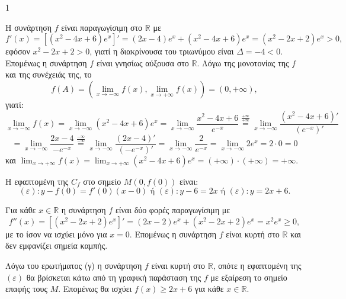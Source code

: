 \begin{ylh}{1}
    \item [Λύση από εικόνα]
\end{ylh}
\begin{alist}
\item Η συνάρτηση $f$ είναι παραγωγίσιμη στο $\mathbb{R}$ με
\[
f'(x)=[(x^2-4x+6)e^x]' = (2x-4)e^x+(x^2-4x+6)e^x = (x^2-2x+2)e^x > 0,
\]
εφόσον $x^2-2x+2 > 0$, γιατί η διακρίνουσα του τριωνύμου είναι $\Delta = -4 < 0$.
Επομένως η συνάρτηση $f$ είναι γνησίως αύξουσα στο $\mathbb{R}$.
Λόγω της μονοτονίας της $f$ και της συνέχειάς της, το
\[
f(A) = \left(\lim_{x \to -\infty} f(x), \lim_{x \to +\infty} f(x)\right) = (0, +\infty),
\]
γιατί:
\[
\lim_{x \to -\infty} f(x) = \lim_{x \to -\infty} (x^2-4x+6)e^x = \lim_{x \to -\infty} \frac{x^2-4x+6}{e^{-x}} \overset{\frac{+\infty}{+\infty}}{=} \lim_{x \to -\infty} \frac{(x^2-4x+6)'}{(e^{-x})'}
\]
\[
= \lim_{x \to -\infty} \frac{2x-4}{-e^{-x}} \overset{\frac{-\infty}{-\infty}}{=} \lim_{x \to -\infty} \frac{(2x-4)'}{(-e^{-x})'} = \lim_{x \to -\infty} \frac{2}{e^{-x}} = \lim_{x \to -\infty} 2e^x = 2 \cdot 0 = 0
\]
και $\lim_{x \to +\infty} f(x) = \lim_{x \to +\infty} (x^2-4x+6)e^x = (+\infty) \cdot (+\infty) = +\infty$.

\item Η εφαπτομένη της $C_f$ στο σημείο $M(0, f(0))$ είναι:
\[
(\varepsilon): y - f(0) = f'(0)(x-0) \text{ ή } (\varepsilon): y-6=2x \text{ ή } (\varepsilon): y=2x+6.
\]

\item Για κάθε $x \in \mathbb{R}$ η συνάρτηση $f$ είναι δύο φορές παραγωγίσιμη με
\[
f''(x)=[(x^2-2x+2)e^x]' = (2x-2)e^x+(x^2-2x+2)e^x = x^2e^x \ge 0,
\]
με το ίσον να ισχύει μόνο για $x=0$. Επομένως η συνάρτηση $f$ είναι κυρτή στο $\mathbb{R}$ και δεν εμφανίζει σημεία καμπής.

\item Λόγω του ερωτήματος (γ) η συνάρτηση $f$ είναι κυρτή στο $\mathbb{R}$, οπότε η εφαπτομένη της $(\varepsilon)$ θα βρίσκεται κάτω από τη γραφική παράσταση της $f$ με εξαίρεση το σημείο επαφής τους $M$. Επομένως θα ισχύει $f(x) \ge 2x+6$ για κάθε $x \in \mathbb{R}$.
\end{alist}